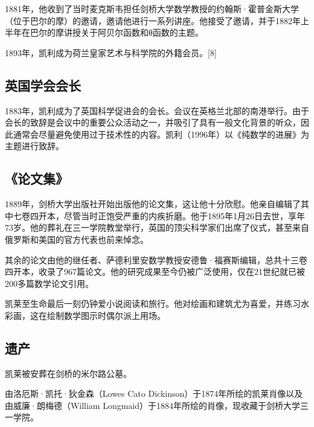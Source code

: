 1881年，他收到了当时麦克斯韦担任剑桥大学数学教授的约翰斯·霍普金斯大学（位于巴尔的摩）的邀请，邀请他进行一系列讲座。他接受了邀请，并于1882年上半年在巴尔的摩讲授关于阿贝尔函数和θ函数的主题。

1893年，凯利成为荷兰皇家艺术与科学院的外籍会员。[8]
\subsection{英国学会会长}  
1883年，凯利成为了英国科学促进会的会长。会议在英格兰北部的南港举行。由于会长的致辞是会议中的重要公众活动之一，并吸引了具有一般文化背景的听众，因此通常会尽量避免使用过于技术性的内容。凯利（1996年）以《纯数学的进展》为主题进行致辞。
\subsection{《论文集》}  
1889年，剑桥大学出版社开始出版他的论文集，这让他十分欣慰。他亲自编辑了其中七卷四开本，尽管当时正饱受严重的内疾折磨。他于1895年1月26日去世，享年73岁。他的葬礼在三一学院教堂举行，英国的顶尖科学家们出席了仪式，甚至来自俄罗斯和美国的官方代表也前来悼念。  

其余的论文由他的继任者、萨德利里安数学教授安德鲁·福赛斯编辑，总共十三卷四开本，收录了967篇论文。他的研究成果至今仍被广泛使用，仅在21世纪就已被200多篇数学论文引用。  

凯莱至生命最后一刻仍钟爱小说阅读和旅行。他对绘画和建筑尤为喜爱，并练习水彩画，这在绘制数学图示时偶尔派上用场。
\subsection{遗产}
凯莱被安葬在剑桥的米尔路公墓。  

由洛厄斯·凯托·狄金森（Lowes Cato Dickinson）于1874年所绘的凯莱肖像以及由威廉·朗梅德（William Longmaid）于1884年所绘的肖像，现收藏于剑桥大学三一学院。